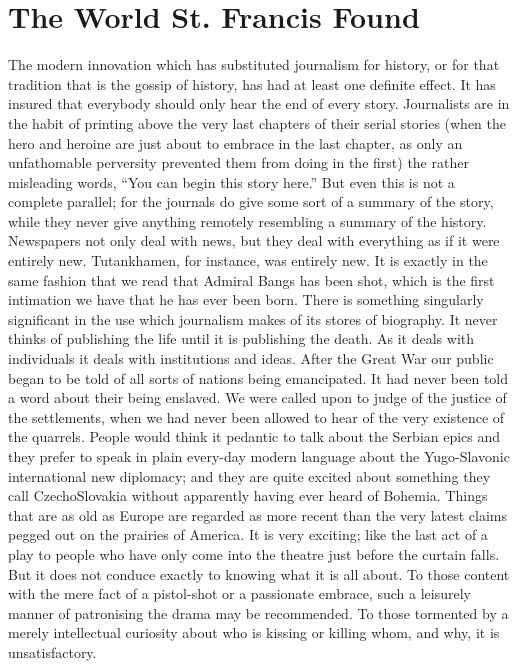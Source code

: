 \documentclass{book}
\begin{document}
\chapter{The World St. Francis Found}
\label{chapter-1}
The modern innovation which has substituted journalism for history, or for that tradition that is the gossip of history, has had at least one definite effect. It has insured that everybody should only hear the end of every story. Journalists are in the habit of printing above the very last chapters of their serial stories (when the hero and heroine are just about to embrace in the last chapter, as only an unfathomable perversity prevented them from doing in the first) the rather misleading words, “You can begin this story here.” But even this is not a complete parallel; for the journals do give some sort of a summary of the story, while they never give anything remotely resembling a summary of the history. Newspapers not only deal with news, but they deal with everything as if it were entirely new. Tutankhamen, for instance, was entirely new. It is exactly in the same fashion that we read that Admiral Bangs has been shot, which is the first intimation we have that he has ever been born. There is something singularly significant in the use which journalism makes of its stores of biography. It never thinks of publishing the life until it is publishing the death. As it deals with individuals it deals with institutions and ideas. After the Great War our public began to be told of all sorts of nations being emancipated. It had never been told a word about their being enslaved. We were called upon to judge of the justice of the settlements, when we had never been allowed to hear of the very existence of the quarrels. People would think it pedantic to talk about the Serbian epics and they prefer to speak in plain every-day modern language about the Yugo-Slavonic international new diplomacy; and they are quite excited about something they call CzechoSlovakia without apparently having ever heard of Bohemia. Things that are as old as Europe are regarded as more recent than the very latest claims pegged out on the prairies of America. It is very exciting; like the last act of a play to people who have only come into the theatre just before the curtain falls. But it does not conduce exactly to knowing what it is all about. To those content with the mere fact of a pistol-shot or a passionate embrace, such a leisurely manner of patronising the drama may be recommended. To those tormented by a merely intellectual curiosity about who is kissing or killing whom, and why, it is unsatisfactory.
\end{document}
